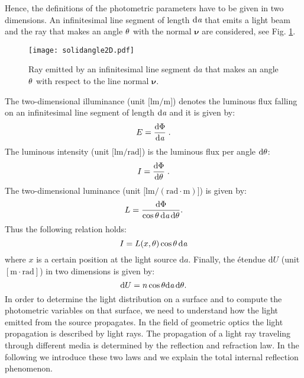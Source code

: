 Hence, the definitions of the photometric parameters have to be given in two dimensions. An infinitesimal line segment of length $\textrm{d}\textit{a}$ that emits a light beam and the ray that makes an angle $\theta$ with the normal $\boldsymbol{\nu}$ are considered, see Fig. \ref{fig:2Dsolidangle}. 
\begin{figure}[h]
 \label{fig:2Dsolidangle}
     \begin{center}
     \texttt{[image: solidangle2D.pdf]}
     \end{center}
     \caption{Ray emitted by an infinitesimal line segment $\textrm{d}a$ that makes an angle $\theta$ with respect to the line normal $\boldsymbol{\nu}$.}
\label{fig:2Dsolidangle}
 \end{figure}
The two-dimensional illuminance \big(unit $\big[\textrm{lm}/\textrm{m}\big]$\big) denotes the luminous flux falling on an infinitesimal line segment of length $\textrm{d}\textit{a}$ 
and it is given by:
 \begin{equation}
 E=\frac{\textrm{d}\Phi}{\textrm{d}\textit{a}}\;.
 \end{equation}
 The luminous intensity \big(unit $\big[\textrm{lm}/\textrm{rad}\big]$\big) is the luminous flux per angle $\textrm{d}\theta$:
 \begin{equation}
 I=\frac{\textrm{d}\Phi}{\textrm{d}\theta}\;.
 \end{equation}
 The two-dimensional luminance \big(unit $\big[\textrm{lm}/(\textrm{rad}\cdot \textrm{m})\big]$\big) is given by:
 \begin{equation}
 L= \frac{\textrm {d}\Phi}{\cos\theta\,\textrm{d}\textit{a} \,\textrm{d}\theta}.
 \end{equation}
 Thus the following relation holds:
 \begin{equation}
 I = L(x, \theta)\cos\theta\,\textrm{d}\textit{a}
 \end{equation}
where $x$ is a certain position at the light source $\textrm{d}a$.
 Finally, the \'{e}tendue $\textrm{d}U $ (unit $[\textrm{m}\cdot \textrm{rad}]$) in two dimensions is given by:
\begin{equation}\label{etendue2d}
\textrm{d}U = n\cos\theta\textrm{d}\textit{a}\,\textrm{d}\theta.
\end{equation}
In order to determine the light distribution on a surface and to compute the photometric variables on that surface, we need to understand how the light emitted from the source propagates. In the field of geometric optics the light propagation is described by light rays.
The propagation of a light ray traveling through  different media is determined by the reflection and refraction law.
In the following we introduce these two laws and we explain the total internal reflection phenomenon.
